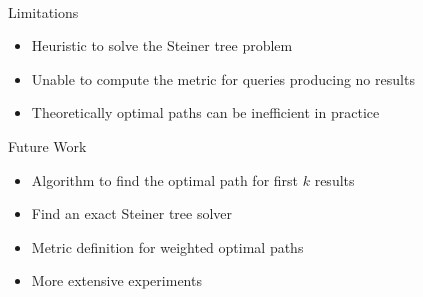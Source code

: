     
\begin{frame}{Limitations}
    \begin{itemize}
        \item Heuristic to solve the Steiner tree problem
        \item Unable to compute the metric for queries producing no results
        \item Theoretically optimal paths can be inefficient in practice
    \end{itemize}
\end{frame}

\begin{frame}{Future Work}
    \begin{itemize}
        \item Algorithm to find the optimal path for first $ k $ results
        \item Find an exact Steiner tree solver
        \item Metric definition for weighted optimal paths
        \item More extensive experiments
    \end{itemize}
\end{frame}